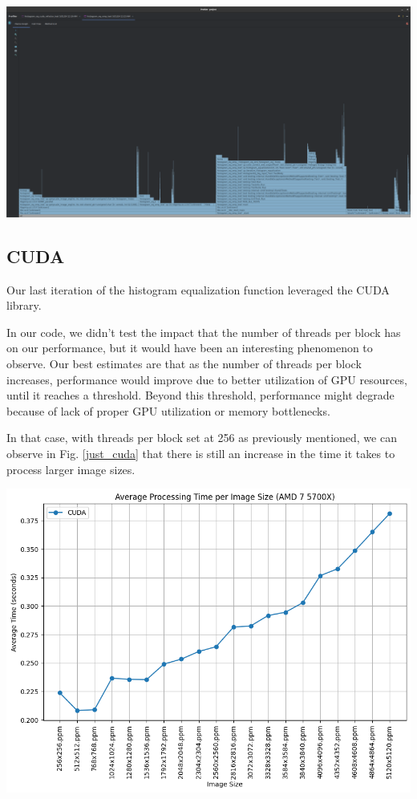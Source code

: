 \documentclass[sigconf]{acmart}
\begin{document}
\begin{center}
    \includegraphics[width=0.8\linewidth]{vizs/omp_profiler.png}
    \label{omp_profiler}
\end{center}

\subsection{CUDA}

Our last iteration of the histogram equalization function leveraged the CUDA library.

In our code, we didn't test the impact that the number of threads per block has on our performance, but it would have been an interesting phenomenon to observe. Our best estimates are that as the number of threads per block increases, performance would improve due to better utilization of GPU resources, until it reaches a threshold. Beyond this threshold, performance might degrade because of lack of proper GPU utilization or memory bottlenecks.

In that case, with threads per block set at 256 as previously mentioned, we can observe in Fig. \ref{just_cuda} that there is still an increase in the time it takes to process larger image sizes. 


\begin{center}
    \includegraphics[width=0.8\linewidth]{vizs/just_cuda.png}
    \label{just_cuda}
\end{center}
\end{document}
